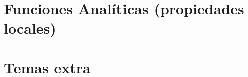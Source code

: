 \documentclass[digital]{fc-hw-template}
\begin{document}
\section{Funciones Analíticas (propiedades locales)}





\section{Temas extra}



\end{document}

